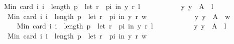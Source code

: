 \begin{isabellebody}
\isanewline
\ \ \ \ \ \ {\isachardoublequoteopen}{\isasymnot}\ Min\ {\isacharbraceleft}{\kern0pt}card\ {\isacharbraceleft}{\kern0pt}i{\isachardot}{\kern0pt}\ i\ {\isacharless}{\kern0pt}\ length\ p\ {\isasymand}\ {\isacharparenleft}{\kern0pt}let\ r\ {\isacharequal}{\kern0pt}\ {\isacharparenleft}{\kern0pt}p{\isacharbang}{\kern0pt}i{\isacharparenright}{\kern0pt}\ in\ {\isacharparenleft}{\kern0pt}y\ {\isasympreceq}\isactrlsub r\ l{\isacharparenright}{\kern0pt}{\isacharparenright}{\kern0pt}{\isacharbraceright}{\kern0pt}\ {\isacharbar}{\kern0pt}\isanewline
\ \ \ \ \ \ \ \ \ \ y{\isachardot}{\kern0pt}\ y\ {\isasymin}\ A\ {\isacharminus}{\kern0pt}\ {\isacharbraceleft}{\kern0pt}l{\isacharbraceright}{\kern0pt}{\isacharbraceright}{\kern0pt}\ {\isacharless}{\kern0pt}\isanewline
\ \ \ \ \ \ \ \ Min\ {\isacharbraceleft}{\kern0pt}card\ {\isacharbraceleft}{\kern0pt}i{\isachardot}{\kern0pt}\ i\ {\isacharless}{\kern0pt}\ length\ p\ {\isasymand}\ {\isacharparenleft}{\kern0pt}let\ r\ {\isacharequal}{\kern0pt}\ {\isacharparenleft}{\kern0pt}p{\isacharbang}{\kern0pt}i{\isacharparenright}{\kern0pt}\ in\ {\isacharparenleft}{\kern0pt}y\ {\isasympreceq}\isactrlsub r\ w{\isacharparenright}{\kern0pt}{\isacharparenright}{\kern0pt}{\isacharbraceright}{\kern0pt}\ {\isacharbar}{\kern0pt}\isanewline
\ \ \ \ \ \ \ \ \ \ \ \ y{\isachardot}{\kern0pt}\ y\ {\isasymin}\ A\ {\isacharminus}{\kern0pt}\ {\isacharbraceleft}{\kern0pt}w{\isacharbraceright}{\kern0pt}{\isacharbraceright}{\kern0pt}{\isachardoublequoteclose}\isanewline
\ \ \ \ \isamarkupfalse%
\isanewline
\ \ \ \ \ \ {\isachardoublequoteopen}Min\ {\isacharbraceleft}{\kern0pt}card\ {\isacharbraceleft}{\kern0pt}i{\isachardot}{\kern0pt}\ i\ {\isacharless}{\kern0pt}\ length\ p\ {\isasymand}\ {\isacharparenleft}{\kern0pt}let\ r\ {\isacharequal}{\kern0pt}\ {\isacharparenleft}{\kern0pt}p{\isacharbang}{\kern0pt}i{\isacharparenright}{\kern0pt}\ in\ {\isacharparenleft}{\kern0pt}y\ {\isasympreceq}\isactrlsub r\ l{\isacharparenright}{\kern0pt}{\isacharparenright}{\kern0pt}{\isacharbraceright}{\kern0pt}\ {\isacharbar}{\kern0pt}\isanewline
\ \ \ \ \ \ \ \ \ \ y{\isachardot}{\kern0pt}\ y\ {\isasymin}\ A\ {\isacharminus}{\kern0pt}\ {\isacharbraceleft}{\kern0pt}l{\isacharbraceright}{\kern0pt}{\isacharbraceright}{\kern0pt}\ {\isasymge}\isanewline
\ \ \ \ \ \ \ \ Min\ {\isacharbraceleft}{\kern0pt}card\ {\isacharbraceleft}{\kern0pt}i{\isachardot}{\kern0pt}\ i\ {\isacharless}{\kern0pt}\ length\ p\ {\isasymand}\ {\isacharparenleft}{\kern0pt}let\ r\ {\isacharequal}{\kern0pt}\ {\isacharparenleft}{\kern0pt}p{\isacharbang}{\kern0pt}i{\isacharparenright}{\kern0pt}\ in\ {\isacharparenleft}{\kern0pt}y\ {\isasympreceq}\isactrlsub r\ w{\isacharparenright}{\kern0pt}{\isacharparenright}{\kern0pt}{\isacharbraceright}{\kern0pt}\ {\isacharbar}{\kern0pt}\isanewline

\end{isabellebody}
